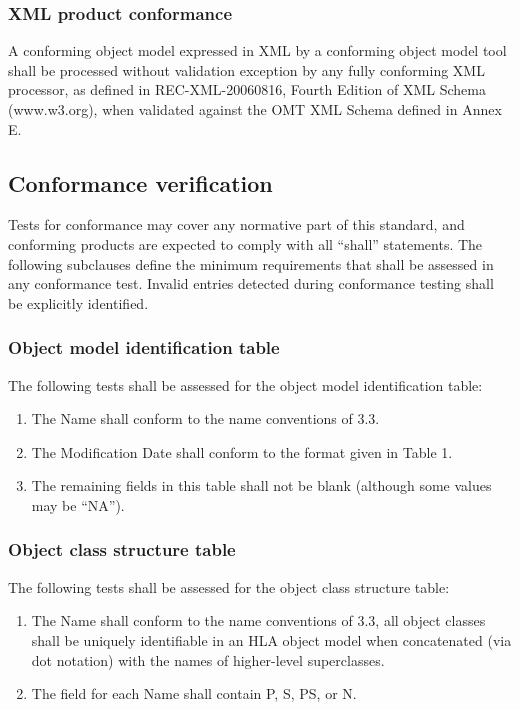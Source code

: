 \subsubsection{XML product conformance}
A conforming object model expressed in XML by a conforming object model tool shall be processed without validation exception by any fully conforming XML processor, as defined in REC-XML-20060816, Fourth Edition of XML Schema (www.w3.org), when validated against the OMT XML Schema defined in Annex E.

\subsection{Conformance verification}
Tests for conformance may cover any normative part of this standard, and conforming products are expected to comply with all ``shall'' statements. The following subclauses define the minimum requirements that shall be assessed in any conformance test. Invalid entries detected during conformance testing shall be explicitly identified.

\subsubsection{Object model identification table}
The following tests shall be assessed for the object model identification table:
\begin{enumerate}[label=\arabic*),leftmargin=42pt,labelsep=8pt,itemsep=1.2pt,topsep=2pt]
\item The Name shall conform to the name conventions of 3.3.
\item The Modification Date shall conform to the format given in Table 1.
\item The remaining fields in this table shall not be blank (although some values may be ``NA'').
\end{enumerate}

\subsubsection{Object class structure table}
The following tests shall be assessed for the object class structure table:
\begin{enumerate}[label=\arabic*),leftmargin=42pt,labelsep=8pt,itemsep=1.2pt,topsep=2pt]
\item The Name shall conform to the name conventions of 3.3, all object classes shall be uniquely identifiable in an HLA object model when concatenated (via dot notation) with the names of higher-level superclasses.
\item The  field for each Name shall contain P, S, PS, or N.
\end{enumerate}


